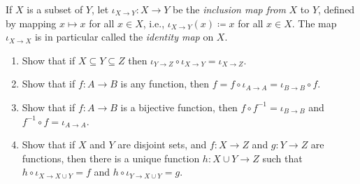 \begin{exercise} \label{exercise 3.3.8}
If \(X\) is a subset of \(Y\), let \(\iota_{X \to Y} : X \to Y\) be the \emph{inclusion map from} \(X\) to \(Y\), defined by mapping \(x \mapsto x\) for all \(x \in X\), i.e., \(\iota_{X \to Y}(x) \coloneqq x\) for all \(x \in X\).
The map \(\iota_{X \to X}\) is in particular called the \emph{identity map} on \(X\).
    \begin{enumerate}
        \item Show that if \(X \subseteq Y \subseteq Z\) then \(\iota_{Y \to Z} \circ \iota_{X \to Y} = \iota_{X \to Z}\).
        \item Show that if \(f : A \to B\) is any function, then \(f = f \circ \iota_{A \to A} = \iota_{B \to B} \circ f\).
        \item Show that if \(f : A \to B\) is a bijective function, then \(f \circ f^{-1} = \iota_{B \to B}\) and \(f^{-1} \circ f = \iota_{A \to A}\).
        \item Show that if \(X\) and \(Y\) are disjoint sets, and \(f : X \to Z\) and \(g : Y \to Z\) are functions, then there is a unique function \(h : X \cup Y \to Z\) such that \(h \circ \iota_{X \to X \cup Y} = f\) and \(h \circ \iota_{Y \to X \cup Y} = g\).
    \end{enumerate}
\end{exercise}

